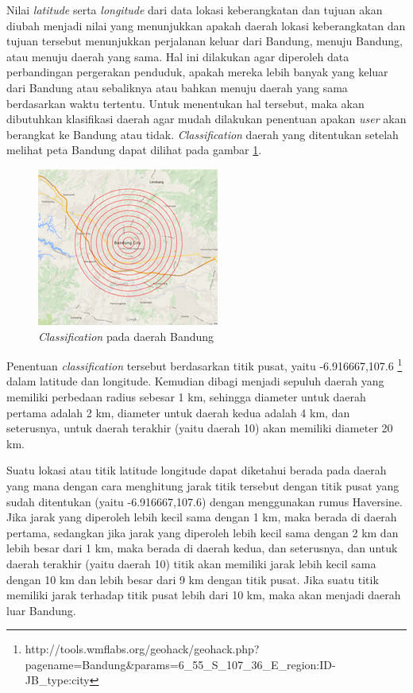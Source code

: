 Nilai \textsl{latitude} serta \textsl{longitude} dari data lokasi keberangkatan dan tujuan akan diubah menjadi nilai yang menunjukkan apakah daerah lokasi keberangkatan dan tujuan tersebut menunjukkan perjalanan keluar dari Bandung, menuju Bandung, atau menuju daerah yang sama. Hal ini dilakukan agar diperoleh data perbandingan pergerakan penduduk, apakah mereka lebih banyak yang keluar dari Bandung atau sebaliknya atau bahkan menuju daerah yang sama berdasarkan waktu tertentu. Untuk menentukan hal tersebut, maka akan dibutuhkan klasifikasi daerah agar mudah dilakukan penentuan apakan \textsl{user} akan berangkat ke Bandung atau tidak. \textsl{Classification} daerah yang ditentukan setelah melihat peta Bandung dapat dilihat pada gambar \ref{fig:classificationMap}.

\begin{figure}
\centering
\includegraphics[scale=1]{Gambar/classificationmap.jpg}
\caption[\textsl{Classification} pada daerah Bandung]{\textsl{Classification} pada daerah Bandung}
\label{fig:classificationMap} 
\end{figure}

Penentuan \textsl{classification} tersebut berdasarkan titik pusat, yaitu -6.916667,107.6 \footnote{http://tools.wmflabs.org/geohack/geohack.php?pagename=Bandung\&params=6\_55\_S\_107\_36\_E\_region:ID-JB\_type:city} dalam latitude dan longitude. Kemudian dibagi menjadi sepuluh daerah yang memiliki perbedaan radius sebesar 1 km, sehingga diameter untuk daerah pertama adalah 2 km, diameter untuk daerah kedua adalah 4 km, dan seterusnya, untuk daerah terakhir (yaitu daerah 10) akan memiliki diameter 20 km.

Suatu lokasi atau titik latitude longitude dapat diketahui berada pada daerah yang mana dengan cara menghitung jarak titik tersebut dengan titik pusat yang sudah ditentukan (yaitu -6.916667,107.6) dengan menggunakan rumus Haversine. Jika jarak yang diperoleh lebih kecil sama dengan 1 km, maka berada di daerah pertama, sedangkan jika jarak yang diperoleh lebih kecil sama dengan 2 km dan lebih besar dari 1 km, maka berada di daerah kedua, dan seterusnya, dan untuk daerah terakhir (yaitu daerah 10) titik akan memiliki jarak lebih kecil sama dengan 10 km dan lebih besar dari 9 km dengan titik pusat. Jika suatu titik memiliki jarak terhadap titik pusat lebih dari 10 km, maka akan menjadi daerah luar Bandung.

